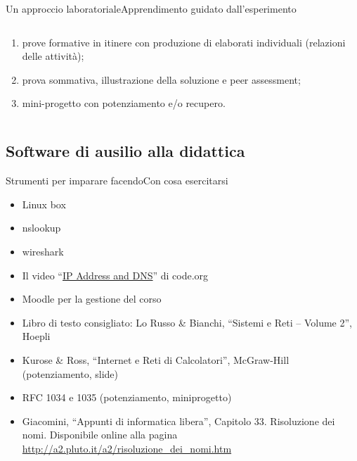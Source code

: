 \documentclass[italian]{beamer}
\begin{document}
\begin{frame}[fragile]{Un approccio laboratoriale}{Apprendimento guidato dall'esperimento}
\begin{columns}
\begin{column}{0.7\textwidth}
\begin{enumerate}
				\item prove formative in itinere con produzione di elaborati individuali (relazioni delle attivit\`a);
				
				\item prova sommativa, illustrazione della soluzione e peer assessment;
				
				\item mini-progetto con potenziamento e/o recupero.
			\end{enumerate}			
			
		\end{column}
	\end{columns}

	\note{%
		
	}%
\end{frame}

\subsection[Strumenti\ldots]{Software di ausilio alla didattica}
\begin{frame}{Strumenti per imparare facendo}{Con cosa esercitarsi}
	\begin{itemize}
		\item Linux box
		
		\item nslookup
		
		\item wireshark
		
		\item Il video ``\hyperlink{https://youtu.be/D-VCk4_GMjQ?list=PLa_solX20V8I8t5sIW7A5Vx3v5YZ-OM3S}{IP Address and DNS}'' di code.org
		
		\item Moodle per la gestione del corso
		
		\item Libro di testo consigliato:  Lo Russo \& Bianchi, ``Sistemi e Reti -- Volume 2'', Hoepli
		
		\item Kurose \& Ross, ``Internet e Reti di Calcolatori'', McGraw-Hill (potenziamento, slide)
		
		\item RFC 1034 e 1035 (potenziamento, miniprogetto)
		
		\item Giacomini, ``Appunti di informatica libera'', Capitolo 33. Risoluzione dei nomi. Disponibile online alla pagina \url{http://a2.pluto.it/a2/risoluzione_dei_nomi.htm}
		
	\end{itemize}
	\note{%
		
	}%
\end{frame}
\end{document}
